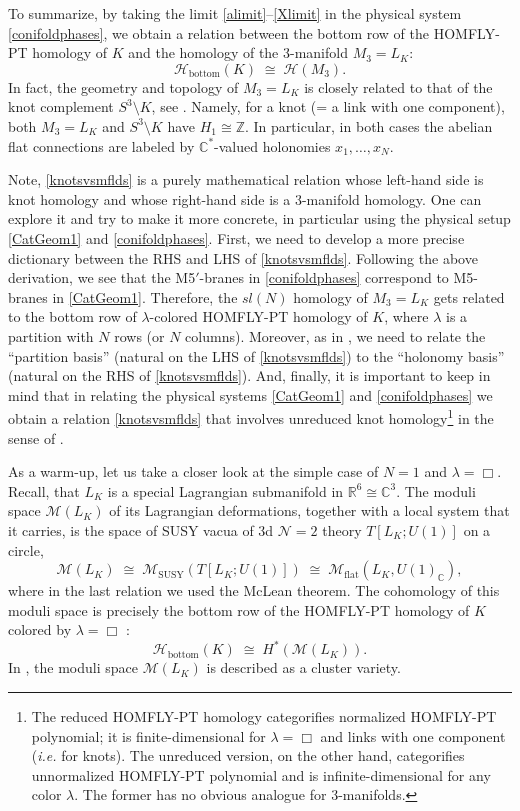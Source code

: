 \documentclass[hyper,letterpaper]{JHEP3}
\newcommand{\be}{\begin{equation}}
\newcommand{\ee}{\end{equation}}
\newcommand{\Z}{{\mathbb Z}}
\newcommand{\R}{{\mathbb R}}
\newcommand{\C}{{\mathbb C}}
\def\CH{{\mathcal H}}
\def\CM{{\mathcal M}}
\def\CN{{\mathcal N}}
\begin{document}
To summarize, by taking the limit \eqref{alimit}--\eqref{Xlimit} in the physical system \eqref{conifoldphases},
we obtain a relation between the bottom row of the HOMFLY-PT homology of $K$ and the homology of the 3-manifold $M_3 = L_K$:
\be
\CH_{\text{bottom}} (K) \; \cong \; \CH (M_3).
\label{knotsvsmflds}
\ee
In fact, the geometry and topology of $M_3 = L_K$ is closely related to that of the knot complement $S^3 \setminus K$,
see \cite{Aganagic:2013jpa}.
Namely, for a knot (= a link with one component), both $M_3 = L_K$ and $S^3 \setminus K$ have $H_1 \cong \Z$.
In particular, in both cases the abelian flat connections are labeled by $\C^*$-valued holonomies $x_1, \ldots, x_N$.

Note, \eqref{knotsvsmflds} is a purely mathematical relation whose left-hand side is knot homology
and whose right-hand side is a 3-manifold homology.
One can explore it and try to make it more concrete, in particular using the physical setup \eqref{CatGeom1} and \eqref{conifoldphases}.
First, we need to develop a more precise dictionary between the RHS and LHS of \eqref{knotsvsmflds}.
Following the above derivation, we see that the M5$'$-branes in \eqref{conifoldphases}
correspond to M5-branes in \eqref{CatGeom1}.
Therefore, the $sl(N)$ homology of $M_3 = L_K$ gets related to the bottom row of $\lambda$-colored HOMFLY-PT homology of $K$,
where $\lambda$ is a partition with $N$ rows (or $N$ columns).
Moreover, as in \cite{Ooguri:1999bv,Labastida:2000yw},
we need to relate the ``partition basis'' (natural on the LHS of \eqref{knotsvsmflds})
to the ``holonomy basis'' (natural on the RHS of \eqref{knotsvsmflds}).
And, finally, it is important to keep in mind that in relating the physical systems \eqref{CatGeom1} and \eqref{conifoldphases}
we obtain a relation \eqref{knotsvsmflds} that involves unreduced knot homology\footnote{The reduced HOMFLY-PT homology
categorifies normalized HOMFLY-PT polynomial; it is finite-dimensional for $\lambda = \Box$ and links with one component
({\it i.e.} for knots). The unreduced version, on the other hand, categorifies unnormalized HOMFLY-PT polynomial and
is infinite-dimensional for any color $\lambda$. The former has no obvious analogue for 3-manifolds.} in the sense of \cite{khovanov2008matrix}.

As a warm-up, let us take a closer look at the simple case of $N=1$ and $\lambda = \Box$.
Recall, that $L_K$ is a special Lagrangian submanifold in $\R^6 \cong \C^3$.
The moduli space $\CM (L_K)$ of its Lagrangian deformations, together with a local system that it carries,
is the space of SUSY vacua of 3d $\CN=2$ theory $T[L_K;U(1)]$ on a circle,
\be
\CM (L_K) \; \cong \; \CM_{\text{SUSY}} (T[L_K;U(1)]) \; \cong \; \CM_{\text{flat}} (L_K, U(1)_{\C}),
\label{MLK}
\ee
where in the last relation we used the McLean theorem.
The cohomology of this moduli space is precisely the bottom row of the HOMFLY-PT homology
of $K$ colored by $\lambda = \Box$ \cite{Shende:2014ira}:
\be
\CH_{\text{bottom}} (K) \; \cong \; H^* (\CM (L_K)).
\ee
In \cite{Shende:2015mzx}, the moduli space $\CM (L_K)$ is described as a cluster variety.
\end{document}
